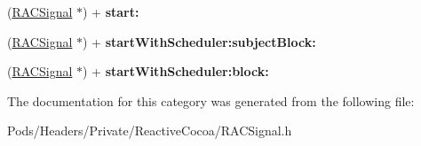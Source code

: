 \begin{DoxyCompactItemize}
\item 
\mbox{\label{category_r_a_c_signal_07_deprecated_08_a0951a904f858019067c4363ede032431}} 
(\mbox{\hyperlink{interface_r_a_c_signal}{R\+A\+C\+Signal}} $\ast$) + {\bfseries start\+:}
\item 
\mbox{\label{category_r_a_c_signal_07_deprecated_08_aba6b849d98a4e495d04e0124b3f3bcdb}} 
(\mbox{\hyperlink{interface_r_a_c_signal}{R\+A\+C\+Signal}} $\ast$) + {\bfseries start\+With\+Scheduler\+:subject\+Block\+:}
\item 
\mbox{\label{category_r_a_c_signal_07_deprecated_08_a06ac2ec4a0d7d06cfc61b0ba934a31ac}} 
(\mbox{\hyperlink{interface_r_a_c_signal}{R\+A\+C\+Signal}} $\ast$) + {\bfseries start\+With\+Scheduler\+:block\+:}
\end{DoxyCompactItemize}


The documentation for this category was generated from the following file\+:\begin{DoxyCompactItemize}
\item 
Pods/\+Headers/\+Private/\+Reactive\+Cocoa/R\+A\+C\+Signal.\+h\end{DoxyCompactItemize}

